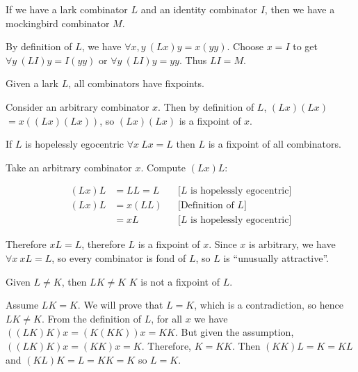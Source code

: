 
\begin{thm}

If we have a lark combinator $L$ and an identity combinator $I$, then we have a
mockingbird combinator $M$.

\bp

By definition of $L$, we have $\forall x, y\ (Lx)y = x(yy)$.  Choose $x = I$ to
get $\forall y\ (LI)y = I(yy)$ or $\forall y\ (LI)y = yy$.  Thus $LI = M$.
\qedhere

\ep

\end{thm}

\begin{thm}

Given a lark $L$, all combinators have fixpoints.

\bp

Consider an arbitrary combinator $x$.  Then by definition of $L$, $(Lx)(Lx)$ 
$= x((Lx)(Lx))$, so $(Lx)(Lx)$ is a fixpoint of $x$. \qedhere

\ep

\end{thm}

\begin{thm}

If $L$ is hopelessly egocentric \ie $\forall x\ Lx = L$ then $L$ is a fixpoint
of all combinators.

\bp

Take an arbitrary combinator $x$.  Compute $(Lx)L$:

\begin{align*}
   (Lx)L &= LL = L    && \text{[$L$ is hopelessly egocentric]}  \\
   (Lx)L &= x(LL)     && \text{[Definition of $L$]} \\
         &= xL        && \text{[$L$ is hopelessly egocentric]}
\end{align*}

\ni Therefore $xL = L$, therefore $L$ is a fixpoint of $x$.  Since $x$ is
arbitrary, we have $\forall x\ xL = L$, so every combinator is fond of $L$, so
$L$ is ``unusually attractive''. \qedhere

\ep

\end{thm}

\begin{thm}

Given $L \neq K$, then $LK \neq K$ \ie $K$ is not a fixpoint of $L$.

\bp

Assume $LK = K$.  We will prove that $L = K$, which is a contradiction, so hence
$LK \neq K$.  From the definition of $L$, for all $x$ we have $((LK)K)x =
(K(KK))x = KK$.  But given the assumption, $((LK)K)x = (KK)x = K$.  Therefore,
$K = KK$.  Then $(KK)L = K = KL$ and $(KL)K = L = KK = K$ so $L = K$.  \qedhere

\ep

\end{thm}

